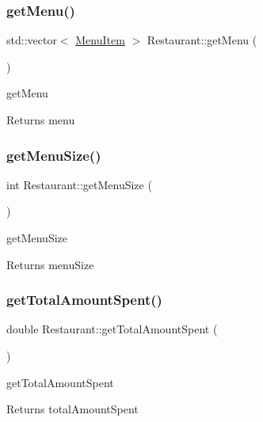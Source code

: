 \subsubsection{\texorpdfstring{get\+Menu()}{getMenu()}}
{\footnotesize\ttfamily std\+::vector$<$ \hyperlink{class_menu_item}{Menu\+Item} $>$ Restaurant\+::get\+Menu (\begin{DoxyParamCaption}{ }\end{DoxyParamCaption})}



get\+Menu 

\begin{DoxyReturn}{Returns}
menu 
\end{DoxyReturn}
\mbox{\label{class_restaurant_a228a01608b506e6a8bf72b7d6f747a7d}} 
\subsubsection{\texorpdfstring{get\+Menu\+Size()}{getMenuSize()}}
{\footnotesize\ttfamily int Restaurant\+::get\+Menu\+Size (\begin{DoxyParamCaption}{ }\end{DoxyParamCaption})}



get\+Menu\+Size 

\begin{DoxyReturn}{Returns}
menu\+Size 
\end{DoxyReturn}
\mbox{\label{class_restaurant_a983d7e6327f4f88d9d5aefe4d6beb7c0}} 
\subsubsection{\texorpdfstring{get\+Total\+Amount\+Spent()}{getTotalAmountSpent()}}
{\footnotesize\ttfamily double Restaurant\+::get\+Total\+Amount\+Spent (\begin{DoxyParamCaption}{ }\end{DoxyParamCaption})}



get\+Total\+Amount\+Spent 

\begin{DoxyReturn}{Returns}
total\+Amount\+Spent 
\end{DoxyReturn}
\mbox{\label{class_restaurant_aefc0ab4b34d2ff5cfc5ab0d9463cf224}} 
